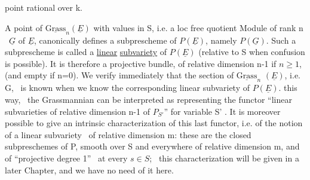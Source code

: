 
point rational over k.

A point of $\underline{\mathrm{Grass}}_n(\underline{E})$ with values in S, i.e. a loc free quotient
Module of rank n \ $\underline{G}$ of $\underline{E}$, canonically defines a subprescheme
of $P(\underline{E})$, namely $P(\underline{G})$. Such a subprescheme is called a \uline{linear}
\uline{subvariety} of $P(\underline{E})$ (relative to S when confusion is possible).
It is therefore a projective bundle, of relative dimension n-1 if $n\geqslant 1$,
(and empty if n=0). We verify immediately that the section of $\underline{\mathrm{Grass}}_n$
$(\underline{E})$, i.e. G, \ is known when we know the corresponding linear subvariety
of $P(\underline{E})$.  this way, \ the Grassmannian can
be interpreted as representing the functor “linear subvarieties
of relative dimension n-1  of $P_{S'}$” for variable S'
. It is moreover possible to give an intrinsic characterization
of this last functor, i.e. of the notion of a linear subvariety
\ of relative dimension m: these are the closed subpreschemes
of P, smooth over S and everywhere of relative dimension m, and of
“projective degree 1” \ at every $s\in S$; \ this characterization will
be given in a later Chapter, and we have no need of it here.

